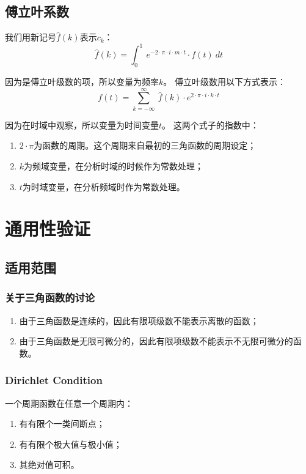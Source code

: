 \subsection{傅立叶系数}
我们用新记号$\hat{f}(k)$表示$c_k$：
\begin{equation}
	\hat{f}(k)=\int_0^1 \ e^{-2\cdot \pi\cdot i\cdot m\cdot t}\cdot f(t)\ dt
\end{equation}

因为是傅立叶级数的项，所以变量为频率$k$。
傅立叶级数用以下方式表示：
\begin{equation}
	f(t)=\sum\limits_{k=-\infty}^\infty\ \hat{f}(k)\cdot e^{2\cdot \pi\cdot i\cdot k\cdot t }
\end{equation}

因为在时域中观察，所以变量为时间变量$t$。
这两个式子的指数中：
\begin{enumerate}
	\item $2\cdot \pi$为函数的周期。这个周期来自最初的三角函数的周期设定；
	\item $k​$为频域变量，在分析时域的时候作为常数处理；
	\item $t$为时域变量，在分析频域时作为常数处理。
\end{enumerate}
\section{通用性验证}
\subsection{适用范围}
\subsubsection{关于三角函数的讨论}
\begin{enumerate}
	\item 由于三角函数是连续的，因此有限项级数不能表示离散的函数；
	\item 由于三角函数是无限可微分的，因此有限项级数不能表示不无限可微分的函数。
\end{enumerate}


\subsubsection{Dirichlet Condition}
一个周期函数在任意一个周期内：
\begin{enumerate}
	\item 有有限个一类间断点；
	\item 有有限个极大值与极小值；
	\item 其绝对值可积。
\end{enumerate}

